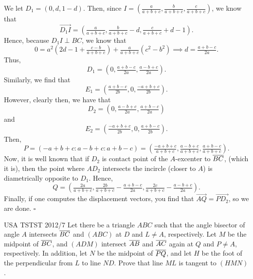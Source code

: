 \documentclass{article}
\begin{document}
We let $D_1 = (0, d, 1-d)$. Then, since $I = \left(\tfrac{a}{a+b+c}, \tfrac{b}{a+b+c}, \tfrac{c}{a+b+c}\right)$, we know that \[\overrightarrow{D_1I} = \left(\tfrac{a}{a+b+c}, \tfrac{b}{a+b+c}-d, \tfrac{c}{a+b+c}+d-1\right).\] Hence, because $D_1I \perp BC$, we know that \[0 = a^2\left(2d-1+\tfrac{c-b}{a+b+c}\right)+\tfrac{a}{a+b+c}(c^2-b^2) \implies d = \tfrac{a+b-c}{2a}.\] Thus, \[D_1 = \left(0, \tfrac{a+b-c}{2a}, \tfrac{a-b+c}{2a}\right).\] Similarly, we find that \[E_1 = \left(\tfrac{a+b-c}{2b}, 0, \tfrac{-a+b+c}{2b}\right).\] However, clearly then, we have that \[D_2 = \left(0, \tfrac{a-b+c}{2a}, \tfrac{a+b-c}{2a}\right)\] and \[E_2 = \left(\tfrac{-a+b+c}{2b}, 0, \tfrac{a+b-c}{2b}\right).\] Then, \[P = \left(-a+b+c : a-b+c : a+b-c\right) = \left(\tfrac{-a+b+c}{a+b+c}, \tfrac{a-b+c}{a+b+c}, \tfrac{a+b-c}{a+b+c}\right).\] Now, it is well known that if $D_2$ is contact point of the $A$-excenter to $\overline{BC}$, (which it is), then the point where $AD_2$ intersects the incircle (closer to $A$) is diametrically opposite to $D_1$. Hence, \[Q = \left(\tfrac{2a}{a+b+c}, \tfrac{2b}{a+b+c}-\tfrac{a+b-c}{2a}, \tfrac{2c}{a+b+c}-\tfrac{a-b+c}{2a}\right).\] Finally, if one computes the displacement vectors, you find that $\overrightarrow{AQ} = \overrightarrow{PD_2}$, so we are done. $\square$

\begin{problem}[7.40]{USA TSTST 2012/7}
Let there be a triangle $ABC$ such that the angle bisector of angle $A$ intersects $\overline{BC}$ and $(ABC)$ at $D$ and $L \neq A$, respectively. Let $M$ be the midpoint of $\overline{BC}$, and $(ADM)$ intersect $\overline{AB}$ and $\overline{AC}$ again at $Q$ and $P \neq A$, respectively. In addition, let $N$ be the midpoint of $\overline{PQ}$, and let $H$ be the foot of the perpendicular from $L$ to line $ND$. Prove that line $ML$ is tangent to $(HMN)$.
\end{problem}
\end{document}
